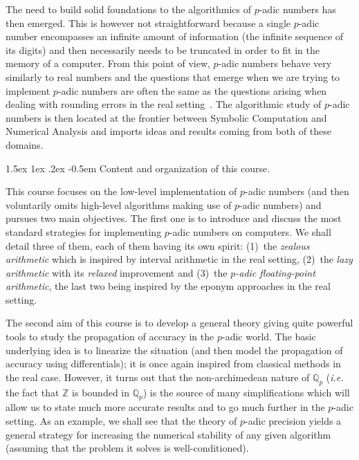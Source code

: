 \documentclass[11pt]{article}
\makeatletter
\numberwithin{equation}{section}
\numberwithin{figure}{section}
\renewcommand\subparagraph{\@startsection{subparagraph}{5}{\z@}%
                                       {1.5ex \@plus1ex \@minus .2ex}%
                                       {-0.5em}%
                                      {\normalfont\normalsize\it}}
\theoremstyle{definition}
\newcommand{\Z}{\mathbb Z}
\newcommand{\Q}{\mathbb Q}
\newcommand{\Qp}{\Q_p}
\makeatother
\begin{document}
The need to build solid foundations to the algorithmics of $p$-adic 
numbers has then emerged. This is however not straightforward because a 
single $p$-adic number encompasses an infinite amount of information 
(the infinite sequence of its digits) and then necessarily needs to be 
truncated in order to fit in the memory of a computer. From this point 
of view, $p$-adic numbers behave very similarly to real numbers and the 
questions that emerge when we are trying to implement $p$-adic numbers 
are often the same as the questions arising when dealing with rounding 
errors in the real setting~\cite{Mu89,DaMu97,Mu09}. The algorithmic study 
of $p$-adic numbers is then located at the frontier between Symbolic 
Computation and Numerical Analysis and imports ideas and results coming 
from both of these domains.

\subparagraph{Content and organization of this course.}

This course focuses on the low-level implementation of $p$-adic numbers 
(and then voluntarily omits high-level algorithms making use of $p$-adic 
numbers) and pursues two main objectives.
The first one is to introduce and discuss the most standard strategies 
for implementing $p$-adic numbers on computers. We shall detail three of 
them, each of them having its own spirit: (1)~the \emph{zealous arithmetic} 
which is inspired by interval arithmetic in the real setting, (2)~the 
\emph{lazy arithmetic} with its \emph{relaxed} improvement and (3)~the 
\emph{$p$-adic floating-point arithmetic}, the last two being inspired
by the eponym approaches in the real setting.

The second aim of this course is to develop a general theory giving 
quite powerful tools to study the propagation of accuracy in the 
$p$-adic world. The basic underlying idea is to linearize the situation 
(and then model the propagation of accuracy using differentials); it is 
once again inspired from classical methods in the real case. %
However, it turns out that the non-archimedean nature of $\Qp$ 
(\emph{i.e.} the fact that $\Z$ is bounded in $\Qp$) is the source of 
many simplifications which will allow us to state much more accurate 
results and to go much further in the $p$-adic setting. As an example,
we shall see that the theory of $p$-adic precision yields a general
strategy for increasing the numerical stability of any given algorithm
(assuming that the problem it solves is well-conditioned).

\medskip
\end{document}
